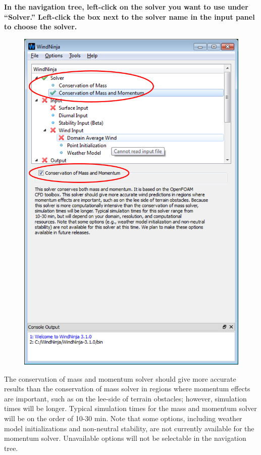\documentclass[12pt]{article}
\begin{document}
\textbf{\color{red}In the navigation tree, left-click on the solver you want to use under “Solver.” Left-click the box next to the solver name in the input panel to choose the solver.}

\begin{figure}[H]
	\centering
	\label{}
	\includegraphics[scale=0.9]{layout_2.png}
\end{figure}

The conservation of mass and momentum solver should give more accurate results than the conservation of mass solver in regions where momentum effects are important, such as on the lee-side of terrain obstacles; however, simulation times will be longer. Typical simulation times for the mass and momentum solver will be on the order of 10-30 min. Note that some options, including weather model initializations and non-neutral stability, are not currently available for the momentum solver. Unavailable options will not be selectable in the navigation tree.
\end{document}
